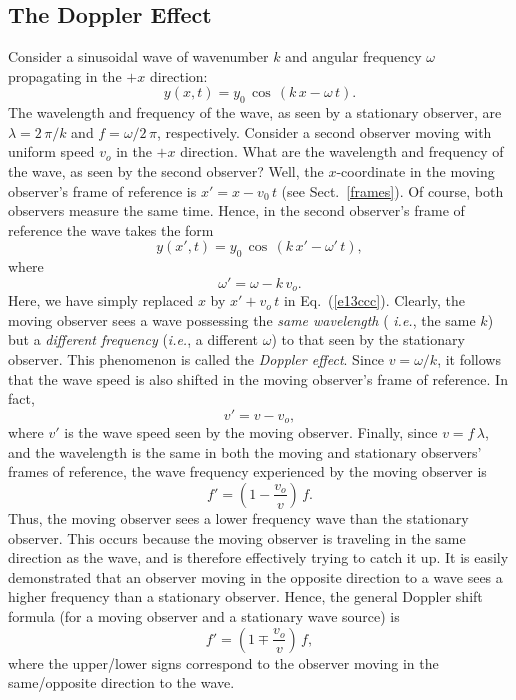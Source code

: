 \subsection{The Doppler Effect}
Consider a sinusoidal wave of wavenumber $k$ and angular frequency $\omega$ propagating
in the $+x$ direction:
\begin{equation}\label{e13ccc}
y(x,t) = y_0\,\cos\,(k\,x-\omega\,t).
\end{equation}
The wavelength and frequency of the wave, as seen by a stationary observer, are
$\lambda = 2\,\pi/k$ and $f=\omega/2\,\pi$, respectively. Consider a second
observer moving with uniform speed $v_o$ in the $+x$ direction. What are
the wavelength and frequency of the wave, as seen by the second observer?
Well, the $x$-coordinate in the moving observer's frame of reference
is $x'=x-v_0\,t$ (see Sect.~\ref{frames}). Of course, both observers measure
the same time. Hence, in the second observer's frame of reference the
wave takes the form
\begin{equation}
y(x',t) = y_0\,\cos\,(k\,x'-\omega'\,t),
\end{equation}
where
\begin{equation}
\omega' = \omega - k\, v_o.
\end{equation}
Here, we have simply replaced $x$ by $x'+v_o\,t$ in Eq.~(\ref{e13ccc}).
Clearly, the moving observer sees a wave possessing the {\em same wavelength} ({\em
i.e.}, the same $k$) but a {\em different frequency} ({\em i.e.}, a different $\omega$)
to that seen by the stationary observer. This phenomenon is called the {\em Doppler effect}. Since
$v=\omega/k$, it follows that the wave speed is also shifted in the moving observer's
frame of reference. In fact,
\begin{equation}
v' = v - v_o,
\end{equation}
where $v'$ is the wave speed seen by the moving observer.
Finally, since $v=f\,\lambda$, and the wavelength is the same in both the moving and
stationary observers' frames of reference, the wave frequency experienced by
the moving observer is
\begin{equation}
f' = \left(1 - \frac{v_o}{v}\right)\,f. 
\end{equation}
Thus, the moving observer sees a lower frequency wave than the stationary observer. This
occurs because the moving observer is traveling in the same
direction as the wave, and  is therefore effectively trying to catch it up. It is easily demonstrated
that an observer moving in the opposite direction to a wave sees a higher frequency
than a stationary observer. Hence, the general Doppler shift formula (for a moving observer and
a stationary wave source) is
\begin{equation}
f' = \left(1 \mp \frac{v_o}{v}\right)\,f,
\end{equation}
where the upper/lower signs correspond to the observer moving in the same/opposite direction
to the wave.

